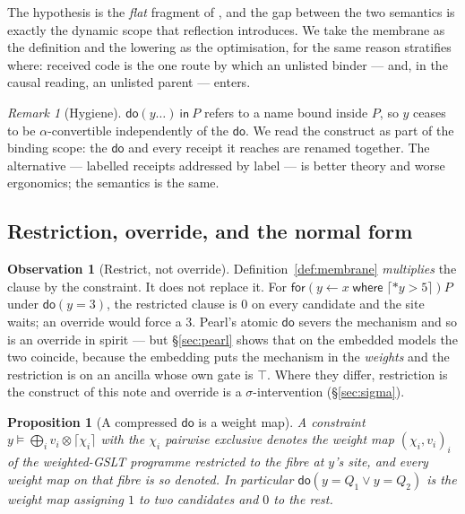 \documentclass[11pt,a4paper]{article}
\theoremstyle{plain}
\newtheorem{proposition}[theorem]{Proposition}
\theoremstyle{definition}
\newtheorem{observation}[theorem]{Observation}
\theoremstyle{remark}
\newtheorem{remark}[theorem]{Remark}
\newcommand{\tensorv}{\otimes}
\newcommand{\crisp}[1]{\lceil #1 \rceil}
\newcommand{\dok}{\textsf{do}}
\newcommand{\ink}{\textsf{in}}
\newcommand{\fork}{\textsf{for}}
\newcommand{\where}{\textsf{where}}
\begin{document}
The hypothesis is the \emph{flat} fragment of \cite{ExpRegimes}, and the gap
between the two semantics is exactly the dynamic scope that reflection
introduces. We take the membrane as the definition and the lowering as the
optimisation, for the same reason \cite{ChoiceFormulae} stratifies \where{}:
received code is the one route by which an unlisted binder --- and, in the
causal reading, an unlisted parent --- enters.

\begin{remark}[Hygiene]
$\dok(y \ldots)\ \ink\ P$ refers to a name bound inside $P$, so $y$ ceases to be
$\alpha$-convertible independently of the $\dok$. We read the construct as part
of the binding scope: the $\dok$ and every receipt it reaches are renamed
together. The alternative --- labelled receipts addressed by label --- is better
theory and worse ergonomics; the semantics is the same.
\end{remark}

\subsection{Restriction, override, and the normal form}

\begin{observation}[Restrict, not override]\label{obs:restrict}
Definition~\ref{def:membrane} \emph{multiplies} the clause by the constraint.
It does not replace it. For $\fork(y \leftarrow x \;\where\; \crisp{*y > 5})P$
under $\dok(y = 3)$, the restricted clause is $0$ on every candidate and the site
waits; an override would force a $3$. Pearl's atomic $\dok$ severs the mechanism
and so is an override in spirit --- but \S\ref{sec:pearl} shows that on the
embedded models the two coincide, because the embedding puts the mechanism in
the \emph{weights} and the restriction is on an ancilla whose own gate is
$\top$. Where they differ, restriction is the construct of this note and
override is a $\sigma$-intervention (\S\ref{sec:sigma}).
\end{observation}

\begin{proposition}[A compressed $\dok$ is a weight map]\label{prop:dnf}
A constraint $y \models \bigoplus_i v_i \tensorv \crisp{\chi_i}$ with the
$\chi_i$ pairwise exclusive denotes the weight map $(\chi_i, v_i)_i$ of the
weighted-GSLT programme restricted to the fibre at $y$'s site, and every weight
map on that fibre is so denoted. In particular $\dok(y = Q_1 \vee y = Q_2)$ is
the weight map assigning $1$ to two candidates and $0$ to the rest.
\end{proposition}
\end{document}
